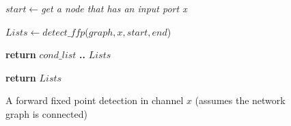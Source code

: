 \begin{figure}
{\begin{minipage}{\dimexpr\linewidth-2\fboxsep-2\fboxrule\relax}
\begin{algorithmic}[1]
    \State $start\gets$\emph{get a node that has an input port x}

    \State $Lists\gets detect\_ffp$($graph, x, start, end$) %
      
      \State \textbf{return} $cond\_list$ \textbf{..} $Lists$

    \EndIf
    \State \textbf{return} $Lists$
  \EndIf

\EndFunction
\end{algorithmic}
\end{minipage}%
}
\caption{A forward fixed point detection in channel $x$ (assumes the network graph is connected)\label{fig:ffp_detect}}
\end{figure}



